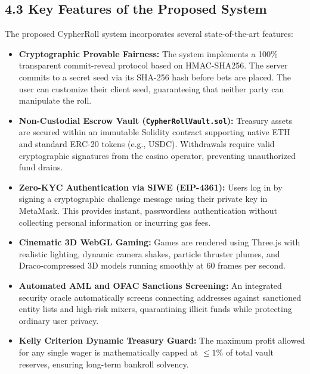 \subsection*{4.3 Key Features of the Proposed System}
The proposed CypherRoll system incorporates several state-of-the-art features:
\begin{itemize}[leftmargin=1.5em]
    \item \textbf{Cryptographic Provable Fairness:} The system implements a 100\% transparent commit-reveal protocol based on HMAC-SHA256. The server commits to a secret seed via its SHA-256 hash before bets are placed. The user can customize their client seed, guaranteeing that neither party can manipulate the roll.
    \item \textbf{Non-Custodial Escrow Vault (\texttt{CypherRollVault.sol}):} Treasury assets are secured within an immutable Solidity contract supporting native ETH and standard ERC-20 tokens (e.g., USDC). Withdrawals require valid cryptographic signatures from the casino operator, preventing unauthorized fund drains.
    \item \textbf{Zero-KYC Authentication via SIWE (EIP-4361):} Users log in by signing a cryptographic challenge message using their private key in MetaMask. This provides instant, passwordless authentication without collecting personal information or incurring gas fees.
    \item \textbf{Cinematic 3D WebGL Gaming:} Games are rendered using Three.js with realistic lighting, dynamic camera shakes, particle thruster plumes, and Draco-compressed 3D models running smoothly at 60 frames per second.
    \item \textbf{Automated AML and OFAC Sanctions Screening:} An integrated security oracle automatically screens connecting addresses against sanctioned entity lists and high-risk mixers, quarantining illicit funds while protecting ordinary user privacy.
    \item \textbf{Kelly Criterion Dynamic Treasury Guard:} The maximum profit allowed for any single wager is mathematically capped at $\le 1\%$ of total vault reserves, ensuring long-term bankroll solvency.
\end{itemize}

